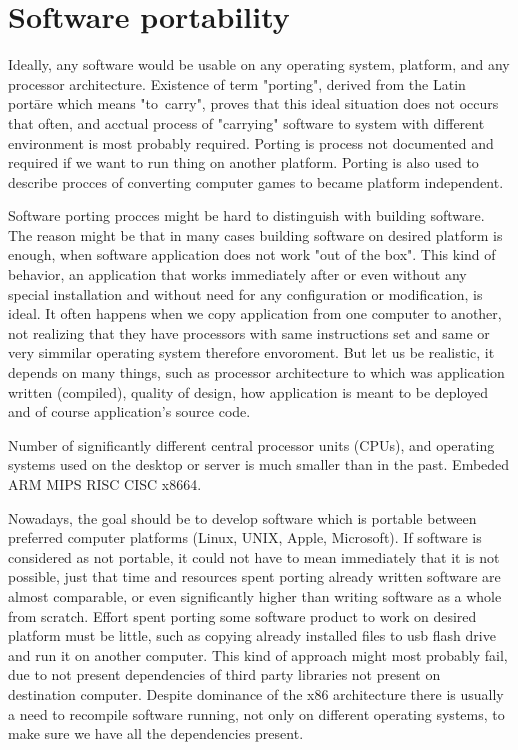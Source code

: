 \chapter{Software portability}\label{porting}

Ideally, any software would be usable on any operating system, platform, and any processor architecture.
Existence of term "porting", derived from the Latin portāre which means "to~carry", proves that this ideal situation does not occurs that often, and acctual process of "carrying" software to system with different environment is most probably required.
Porting is process not documented and required if we want to run thing on another platform.
Porting is also used to describe procces of converting computer games to became platform independent.

Software porting procces might be hard to distinguish with building software.
The reason might be that in many cases building software on desired platform is enough, when software application does not work "out of the box".
This kind of behavior, an application that works immediately after or even without any special installation and without need for any configuration or modification, is ideal.
It often happens when we copy application from one computer to another, not realizing that they have processors with same instructions set and same or very simmilar operating system therefore envoroment.
But let us be realistic, it depends on many things, such as processor architecture to which was application written (compiled), quality of design, how application is meant to be deployed and of course application's source code.

Number of significantly different central processor units (CPUs), and operating systems used on the desktop or server is much smaller than in the past.
Embeded ARM MIPS  RISC CISC x8664.

Nowadays, the goal should be to develop software which is portable between preferred computer platforms (Linux, UNIX, Apple, Microsoft).
If software is considered as not portable, it could not have to mean immediately that it is not possible, just that time and resources spent porting already written software are almost comparable, or even significantly higher than writing software as a whole from scratch.
Effort spent porting some software product to work on desired platform must be little, such as copying already installed files to usb flash drive and run it on another computer.
This kind of approach might most probably fail, due to not present dependencies of third party libraries not present on destination computer.
Despite dominance of the x86 architecture there is usually a need to recompile software running, not only on different operating systems, to make sure we have all the dependencies present.

